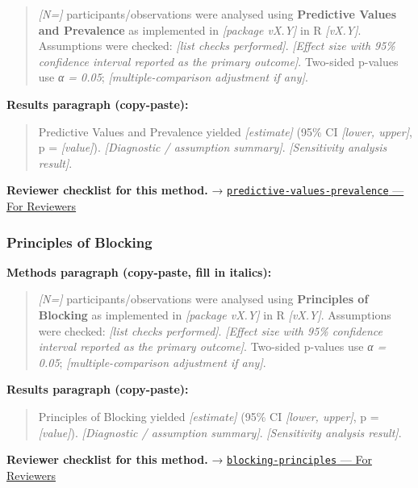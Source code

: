 \documentclass[
]{article}
\begin{document}
\begin{quote}
\emph{{[}N={]}} participants/observations were analysed using
\textbf{Predictive Values and Prevalence} as implemented in
\emph{{[}package vX.Y{]}} in R \emph{{[}vX.Y{]}}. Assumptions were
checked: \emph{{[}list checks performed{]}}. \emph{{[}Effect size with
95\% confidence interval reported as the primary outcome{]}}. Two-sided
p-values use \emph{α = 0.05}; \emph{{[}multiple-comparison adjustment if
any{]}}.
\end{quote}

\textbf{Results paragraph (copy-paste):}

\begin{quote}
Predictive Values and Prevalence yielded \emph{{[}estimate{]}} (95\% CI
\emph{{[}lower, upper{]}}, p = \emph{{[}value{]}}). \emph{{[}Diagnostic
/ assumption summary{]}}. \emph{{[}Sensitivity analysis result{]}}.
\end{quote}

\textbf{Reviewer checklist for this method.} →
\href{../chapters/14-clinical/predictive-values-prevalence.Rmd\#for-reviewers}{\texttt{predictive-values-prevalence}
--- For Reviewers}

\subsubsection{Principles of Blocking}\label{principles-of-blocking}

\textbf{Methods paragraph (copy-paste, fill in italics):}

\begin{quote}
\emph{{[}N={]}} participants/observations were analysed using
\textbf{Principles of Blocking} as implemented in \emph{{[}package
vX.Y{]}} in R \emph{{[}vX.Y{]}}. Assumptions were checked: \emph{{[}list
checks performed{]}}. \emph{{[}Effect size with 95\% confidence interval
reported as the primary outcome{]}}. Two-sided p-values use \emph{α =
0.05}; \emph{{[}multiple-comparison adjustment if any{]}}.
\end{quote}

\textbf{Results paragraph (copy-paste):}

\begin{quote}
Principles of Blocking yielded \emph{{[}estimate{]}} (95\% CI
\emph{{[}lower, upper{]}}, p = \emph{{[}value{]}}). \emph{{[}Diagnostic
/ assumption summary{]}}. \emph{{[}Sensitivity analysis result{]}}.
\end{quote}

\textbf{Reviewer checklist for this method.} →
\href{../chapters/16-design/blocking-principles.Rmd\#for-reviewers}{\texttt{blocking-principles}
--- For Reviewers}
\end{document}
